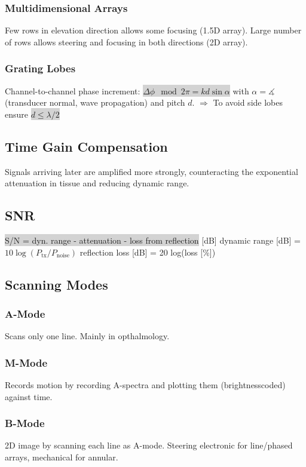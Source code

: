 \documentclass[9pt]{article}
\newcommand{\grey}[1]{\setlength{\fboxsep}{0pt}\colorbox{lightgrey}{#1}}
\begin{document}
\begin{multicols}{2}
\subsubsection{Multidimensional Arrays}
Few rows in elevation direction allows some focusing (1.5D array). Large number of rows allows steering and focusing in both directions (2D array).

\subsubsection{Grating Lobes}
Channel-to-channel phase increment: \grey{$\Delta\phi \mod 2\pi= k d \sin\alpha$} with $\alpha = \measuredangle$(transducer normal, wave propagation) and pitch $d$. $\Rightarrow$ To avoid side lobes ensure \grey{$d \leq \lambda / 2$}

\subsection{Time Gain Compensation}
Signals arriving later are amplified more strongly, counteracting the exponential attenuation in tissue and reducing dynamic range.

\subsection{SNR}
\grey{S/N = dyn. range - attenuation - loss from reflection} [dB]
dynamic range [dB] = $10 \log(P_\mathrm{tx} / P_\mathrm{noise})$
reflection loss [dB] = 20 log(loss [\%])

\subsection{Scanning Modes}
\subsubsection{A-Mode} 
Scans only one line. Mainly in opthalmology.

\subsubsection{M-Mode}
Records motion by recording A-spectra and plotting them (brightnesscoded) against time.

\subsubsection{B-Mode} 2D image by scanning each line as A-mode. Steering electronic for line/phased arrays, mechanical for annular.


\end{multicols}
\end{document}
